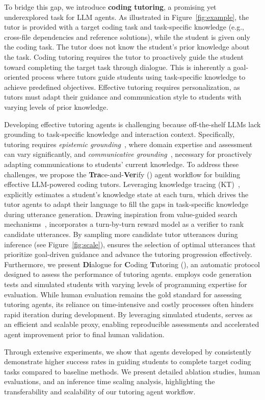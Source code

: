 To bridge this gap, we introduce \textbf{coding tutoring}, a promising yet underexplored task for LLM agents.
As illustrated in Figure~\ref{fig:example}, the tutor is provided with a target coding task and task-specific knowledge (e.g., cross-file dependencies and reference solutions), while the student is given only the coding task. The tutor does not know the student's prior knowledge about the task.
Coding tutoring requires the tutor to proactively guide the student toward completing the target task through dialogue.
This is inherently a goal-oriented process where tutors guide students using task-specific knowledge to achieve predefined objectives. 
Effective tutoring requires personalization, as tutors must adapt their guidance and communication style to students with varying levels of prior knowledge. 


Developing effective tutoring agents is challenging because off-the-shelf LLMs lack grounding to task-specific knowledge and interaction context.
Specifically, tutoring requires \textit{epistemic grounding}~\citep{tsai2016concept}, where domain expertise and assessment can vary significantly, and \textit{communicative grounding}~\citep{chai2018language}, necessary for proactively adapting communications to students' current knowledge.
To address these challenges, we propose the \textbf{Tra}ce-and-\textbf{Ver}ify (\textbf{\model}) agent workflow for building effective LLM-powered coding tutors. 
Leveraging knowledge tracing (KT)~\citep{corbett1994knowledge,scarlatos2024exploring}, \model explicitly estimates a student's knowledge state at each turn, which drives the tutor agents to adapt their language to fill the gaps in task-specific knowledge during utterance generation. 
Drawing inspiration from value-guided search mechanisms~\citep{lightman2023let,wang2024math,zhang2024rest}, \model incorporates a turn-by-turn reward model as a verifier to rank candidate utterances. 
By sampling more candidate tutor utterances during inference (see Figure~\ref{fig:scale}), \model ensures the selection of optimal utterances that prioritize goal-driven guidance and advance the tutoring progression effectively. 
Furthermore, we present \textbf{Di}alogue for \textbf{C}oding \textbf{T}utoring (\textbf{\eval}), an automatic protocol designed to assess the performance of tutoring agents. 
\eval employs code generation tests and simulated students with varying levels of programming expertise for evaluation. While human evaluation remains the gold standard for assessing tutoring agents, its reliance on time-intensive and costly processes often hinders rapid iteration during development. 
By leveraging simulated students, \eval serves as an efficient and scalable proxy, enabling reproducible assessments and accelerated agent improvement prior to final human validation. 



Through extensive experiments, we show that agents developed by \model consistently demonstrate higher success rates in guiding students to complete target coding tasks compared to baseline methods. We present detailed ablation studies, human evaluations, and an inference time scaling analysis, highlighting the transferability and scalability of our tutoring agent workflow.
